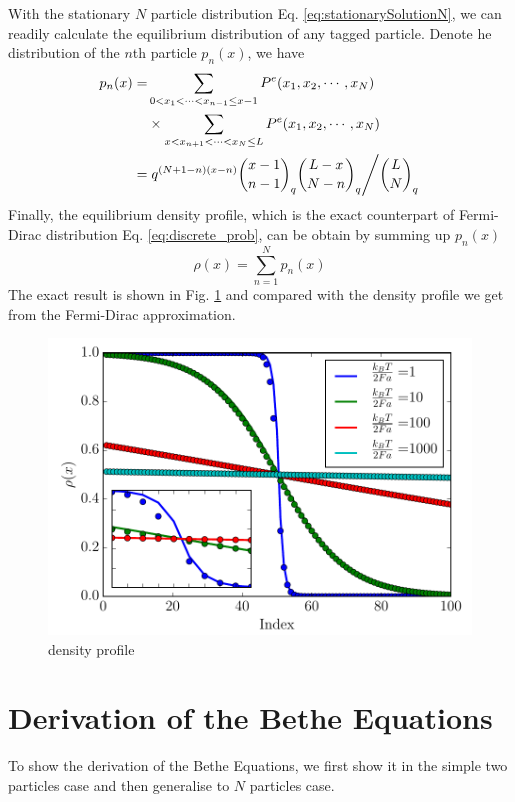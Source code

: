 \documentclass[aps,showpacs,twocolumn,floatfix,prx,superscriptaddress]{revtex4-1}
\begin{document}
With the stationary $N$ particle distribution Eq. \eqref{eq:stationarySolutionN}, we can readily calculate the equilibrium distribution of any tagged particle. Denote he distribution of the $n$th particle $p_n(x)$, we have
\begin{equation}
    \begin{aligned}
        \label{eq:pdfTaggedParticle}
        p_n(x) = & \sum_{0<x_1<\cdots<x_{n-1}\le x-1}P^e(x_1, x_2, \cdots, x_N) \\
        &\times \sum_{x<x_{n+1}<\cdots<x_{N}\le L}P^e(x_1, x_2, \cdots, x_N) \\
        = & \left. q^{(N+1-n)(x-n)} \binom{x-1}{n-1}_q\binom{L-x}{N-n}_q 
            \middle/  \binom{L}{N}_q \right.
    \end{aligned}
\end{equation}
Finally, the equilibrium density profile, which is the exact counterpart of Fermi-Dirac distribution Eq. \eqref{eq:discrete_prob}, can be obtain by summing up $p_n(x)$
\begin{equation}
    \label{eq:densityProfile}
    \rho(x) = \sum_{n=1}^N p_n(x) 
\end{equation}
The exact result is shown in Fig. \ref{fig:densityProfile} and compared with the density profile we get from the Fermi-Dirac approximation. 
\begin{figure}[htpb]
    \centering
    \includegraphics[width=1.0\linewidth]{densityProfile}
    \caption{density profile}
    \label{fig:densityProfile}
\end{figure}


\section{Derivation of the Bethe Equations}
\label{sec:derivation_of_bethe_equations}
To show the derivation of the Bethe Equations, we first show it in the simple two particles case and then generalise to $N$ particles case.
\end{document}
